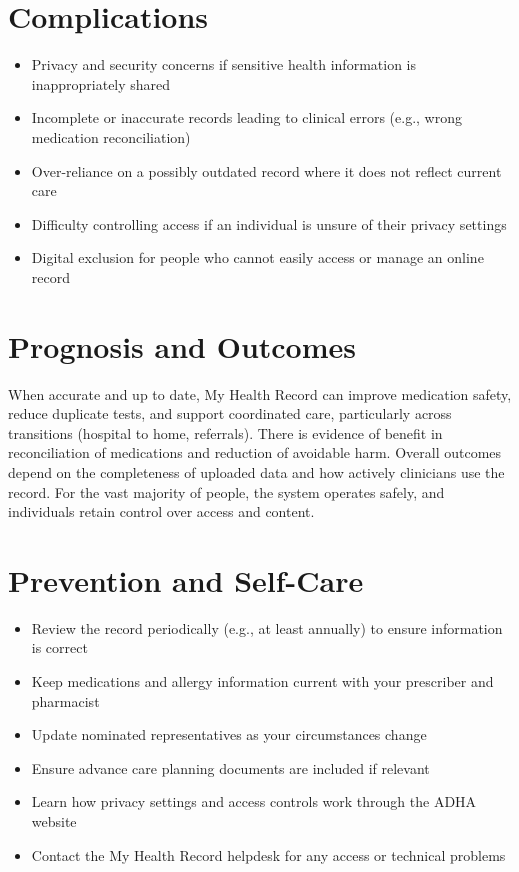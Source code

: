 \section*{Complications}
\begin{itemize}
    \item Privacy and security concerns if sensitive health information is inappropriately shared
    \item Incomplete or inaccurate records leading to clinical errors (e.g., wrong medication reconciliation)
    \item Over-reliance on a possibly outdated record where it does not reflect current care
    \item Difficulty controlling access if an individual is unsure of their privacy settings
    \item Digital exclusion for people who cannot easily access or manage an online record
\end{itemize}

\section*{Prognosis and Outcomes}
When accurate and up to date, My Health Record can improve medication safety, reduce duplicate tests, and support coordinated care, particularly across transitions (hospital to home, referrals). There is evidence of benefit in reconciliation of medications and reduction of avoidable harm. Overall outcomes depend on the completeness of uploaded data and how actively clinicians use the record. For the vast majority of people, the system operates safely, and individuals retain control over access and content.

\section*{Prevention and Self-Care}
\begin{itemize}
    \item Review the record periodically (e.g., at least annually) to ensure information is correct
    \item Keep medications and allergy information current with your prescriber and pharmacist
    \item Update nominated representatives as your circumstances change
    \item Ensure advance care planning documents are included if relevant
    \item Learn how privacy settings and access controls work through the ADHA website
    \item Contact the My Health Record helpdesk for any access or technical problems
\end{itemize}

